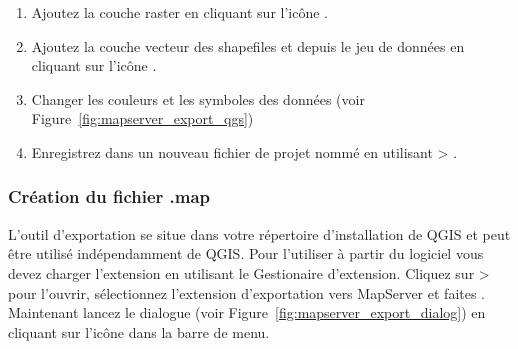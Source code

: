 \begin{enumerate}
\item Ajoutez la couche raster  en cliquant sur l'ic\^one .
\item Ajoutez la couche vecteur des shapefiles  et  depuis le jeu de donn\'ees en cliquant sur l'ic\^one .
\item Changer les couleurs et les symboles des donn\'ees (voir Figure~\ref{fig:mapserver_export_qgs})
\item Enregistrez dans un nouveau fichier de projet nomm\'e  en utilisant  > .
\end{enumerate} 

%

\subsubsection{Cr\'eation du fichier .map}

L'outil  d'exportation se situe dans votre r\'epertoire d'installation de QGIS et peut \^etre utilis\'e ind\'ependamment de QGIS. Pour l'utiliser \`a partir du logiciel vous devez charger l'extension en utilisant le Gestionaire d'extension. Cliquez sur  >  pour l'ouvrir, s\'electionnez l'extension d'exportation vers MapServer et faites . Maintenant lancez le dialogue  (voir Figure~\ref{fig:mapserver_export_dialog}) en cliquant sur l'ic\^one dans la barre de menu.

